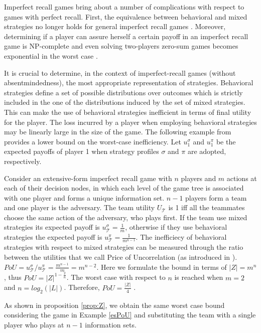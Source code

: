 Imperfect recall games bring about a number of complications with respect to games with perfect recall. First, the equivalence between behavioral and mixed strategies no longer holds for general imperfect recall games \citep{piccione1997}. Moreover, determining if a player can assure herself a certain payoff in an imperfect recall game is NP-complete \citep{koller1992} and even solving two-players zero-sum games becomes exponential in the worst case \citep{koller1994fast}.

It is crucial to determine, in the context of imperfect-recall games (without absentmindedness), the most appropriate representation of strategies. Behavioral strategies define a set of possible distributions over outcomes which is strictly included in the one of the distributions induced by the set of mixed strategies. This can make the use of behavioral strategies inefficient in terms of final utility for the player. The loss incurred by a player when employing behavioral strategies may be linearly large in the size of the game. The following example from \citep{celli18} provides a lower bound on the worst-case inefficiency. Let $u_1^\sigma$ and $u_1^\pi$ be the expected payoffs of player 1 when strategy profiles $\sigma$ and $\pi$ are adopted, respectively.

\begin{example} \label{esPoU}
	Consider an extensive-form imperfect recall game with $n$ players and $m$ actions at each of their decision nodes, in which each level of the game tree is associated with one player and forms a unique information set. $n-1$ players form a team and one player is the adversary. The team utility $U_{\mathcal{T}}$ is 1 iff all the teammates choose the same action of the adversary, who plays first. If the team use mixed strategies its expected payoff is $u_{\mathcal{T}}^\sigma=\frac{1}{m}$, otherwise if they use behavioral strategies the expected payoff is $u_{\mathcal{T}}^\pi=\frac{1}{m^{n-1}}$. The inefficiecy of behavioral strategies with respect to mixed strategies can be measured through the ratio between the utilities that we call Price of Uncorrelation (as introduced in \citep{basilico2017}). $PoU=u_{\mathcal{T}}^\sigma/u_{\mathcal{T}}^\pi=\frac{m^{n-1}}{m}=m^{n-2}$. Here we formulate the bound in terms of $|Z|=m^n$, thus $PoU=|Z|^{1-\frac{2}{n}}$. The worst case with respect to $n$ is reached when $m=2$ and $n=log_{2}(|L|)$. Therefore, $PoU= \frac{|Z|}{4}$ . 
\end{example}


As shown in proposition \ref{prop:Z}, we obtain the same worst case bound considering the game in Example \ref{esPoU} and substituting the team with a single player who plays at $n-1$ information sets.

